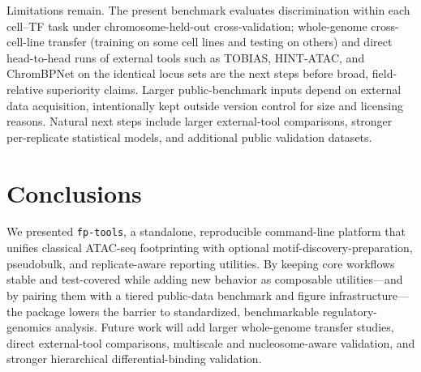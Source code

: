 \documentclass[biomedinformatics,article,submit,pdftex,moreauthors]{Definitions/mdpi}
\begin{document}
Limitations remain. The present benchmark evaluates discrimination within each
cell--TF task under chromosome-held-out cross-validation; whole-genome
cross-cell-line transfer (training on some cell lines and testing on others) and
direct head-to-head runs of external tools such as TOBIAS, HINT-ATAC, and
ChromBPNet on the identical locus sets are the next steps before broad,
field-relative superiority claims. Larger public-benchmark inputs depend on external data acquisition, intentionally
kept outside version control for size and licensing reasons. Natural next steps
include larger external-tool comparisons, stronger per-replicate statistical
models, and additional public validation datasets.

\section{Conclusions}

We presented \texttt{fp-tools}, a standalone, reproducible command-line platform
that unifies classical ATAC-seq footprinting with optional motif-discovery-preparation, pseudobulk, and replicate-aware reporting utilities.
By keeping core workflows stable and test-covered while adding new behavior as
composable utilities---and by pairing them with a tiered public-data benchmark and
figure infrastructure---the package lowers the barrier to standardized,
benchmarkable regulatory-genomics analysis. Future work will add larger whole-genome transfer studies, direct external-tool
comparisons, multiscale and nucleosome-aware validation, and stronger hierarchical
differential-binding validation.

\vspace{6pt}



\end{document}
